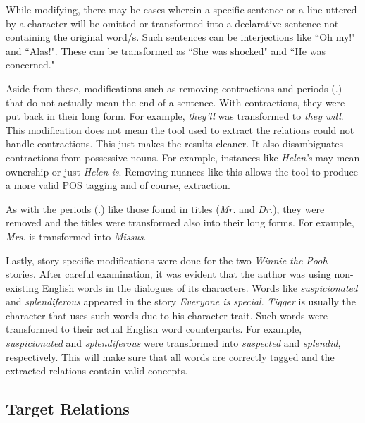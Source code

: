While modifying, there may be cases wherein a specific sentence or a line uttered by a character will be omitted or transformed into a declarative sentence not containing the original word/s. Such sentences can be interjections like ``Oh my!" and ``Alas!". These can be transformed as ``She was shocked" and ``He was concerned."

Aside from these, modifications such as removing contractions and periods (.) that do not actually mean the end of a sentence. With contractions, they were put back in their long form. For example, \textit{they'll} was transformed to \textit{they will}. This modification does not mean the tool used to extract the relations could not handle contractions. This just makes the results cleaner. It also disambiguates contractions from possessive nouns. For example, instances like \textit{Helen's} may mean ownership or just \textit{Helen is}. Removing nuances like this allows the tool to produce a more valid POS tagging and of course, extraction. 

As with the periods (.) like those found in titles (\textit{Mr.} and \textit{Dr.}), they were removed and the titles were transformed also into their long forms. For example, \textit{Mrs.} is transformed into \textit{Missus}. 

Lastly, story-specific modifications were done for the two \textit{Winnie the Pooh} stories. After careful examination, it was evident that the author was using non-existing English words in the dialogues of its characters. Words like \textit{suspicionated} and \textit{splendiferous} appeared in the story \textit{Everyone is special}. \textit{Tigger} is usually the character that uses such words due to his character trait. Such words were transformed to their actual English word counterparts. For example, \textit{suspicionated} and \textit{splendiferous} were transformed into \textit{suspected} and \textit{splendid}, respectively. This will make sure that all words are correctly tagged and the extracted relations contain valid concepts.

\subsection{Target Relations}
\label{sec:relations}

